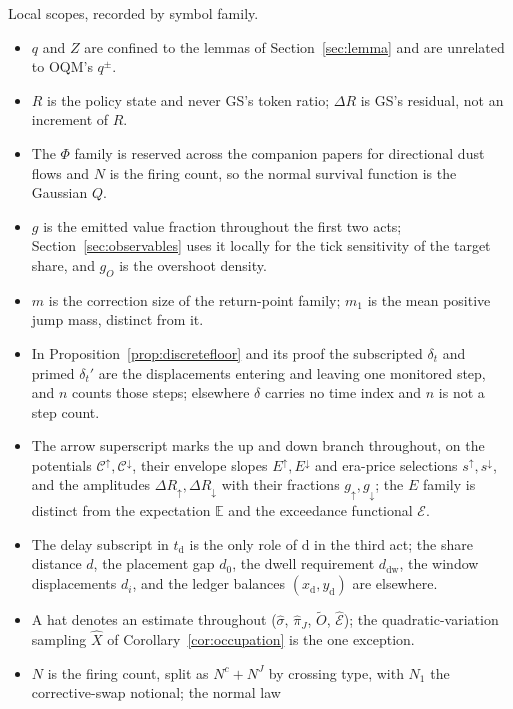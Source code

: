 \documentclass[11pt,a4paper]{article}
\theoremstyle{definition}
\theoremstyle{plain}
\theoremstyle{remark}
\newcommand{\surv}{Q}
\newcommand{\tact}{t_{\mathrm{d}}}
\begin{document}
\begingroup\footnotesize
\noindent Local scopes, recorded by symbol family. 
\begin{itemize}[leftmargin=1.4em, itemsep=0pt, topsep=2pt, parsep=0pt]
\item $q$ and $Z$ are confined to the lemmas of
Section~\ref{sec:lemma} and are unrelated to OQM's $q^\pm$.
\item $R$ is the policy state and never GS's token ratio; $\Delta
R$ is GS's residual, not an increment of $R$.
\item The $\Phi$ family is reserved across the companion papers
for directional dust flows and $N$ is the firing count, so the
normal survival function is the Gaussian $\surv$.
\item $g$ is the emitted value fraction throughout the first two
acts; Section~\ref{sec:observables} uses it locally for the tick
sensitivity of the target share, and $g_O$ is the overshoot density.
\item $m$ is the correction size of the return-point family;
$m_1$ is the mean positive jump mass, distinct from it.
\item In Proposition~\ref{prop:discretefloor} and its proof the
subscripted $\delta_t$ and primed $\delta_t'$ are the displacements
entering and leaving one monitored step, and $n$ counts those steps;
elsewhere $\delta$ carries no time index and $n$ is not a step
count.
\item The arrow superscript marks the up and down branch throughout,
on the potentials $\mathcal{C}^{\uparrow}, \mathcal{C}^{\downarrow}$,
their envelope slopes $E^{\uparrow}, E^{\downarrow}$ and era-price
selections $s^{\uparrow}, s^{\downarrow}$, and the amplitudes $\Delta
R_{\uparrow}, \Delta R_{\downarrow}$ with their fractions
$g_{\uparrow}, g_{\downarrow}$; the $E$ family is distinct from
the expectation $\mathbb{E}$ and the exceedance functional
$\mathcal{E}$.
\item The delay subscript in $\tact$ is the only role of $\mathrm{d}$
in the third act; the share distance $d$, the placement gap $d_0$,
the dwell requirement $d_{\mathrm{dw}}$, the window displacements
$d_i$, and the ledger balances $(x_{\mathrm{d}}, y_{\mathrm{d}})$ are
elsewhere.
\item A hat denotes an estimate throughout ($\hat\sigma$,
$\hat\pi_J$, $\tilde O$, $\hat{\mathcal{E}}$); the
quadratic-variation sampling $\hat X$ of
Corollary~\ref{cor:occupation} is the one exception.
\item $N$ is the firing count, split as $N^{c} + N^{J}$ by crossing
type, with $N_1$ the corrective-swap notional; the normal law

\end{itemize}
\end{document}
